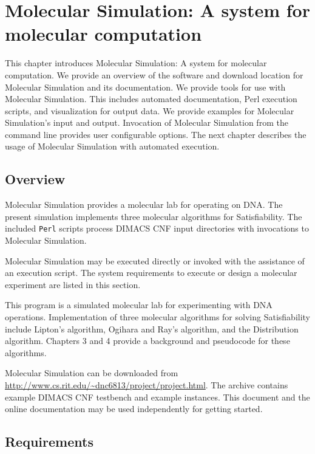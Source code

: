 \chapter{Molecular Simulation: A system for molecular computation}


This chapter introduces Molecular Simulation: A system for molecular computation.  We provide an overview of the software and download location for Molecular Simulation and its documentation. We provide tools for use with Molecular Simulation.  This includes automated documentation, Perl execution scripts, and visualization for output data.  We provide examples for Molecular Simulation's input and output.  Invocation of Molecular Simulation from the command line provides user configurable options.  The next chapter describes the usage of Molecular Simulation with automated execution.
	
	\section{Overview}
	

Molecular Simulation provides a molecular lab for operating on DNA.  The present simulation implements three molecular algorithms for {\sc Satisfiability}.  The included \texttt{Perl} scripts process DIMACS CNF input directories with invocations to Molecular Simulation.

Molecular Simulation may be executed directly or invoked with the assistance of an execution script.  The system requirements to execute or design a molecular experiment are listed in this section.  
		
This program is a simulated molecular lab for experimenting with DNA operations. Implementation of three molecular algorithms for solving {\sc Satisfiability} include Lipton's algorithm, Ogihara and Ray's algorithm, and the Distribution algorithm.  Chapters 3 and 4 provide a background and pseudocode for these algorithms.		

Molecular Simulation can be downloaded from \url{http://www.cs.rit.edu/~dnc6813/project/project.html}.  The archive contains example DIMACS CNF testbench and example instances.  This document and the online documentation may be used independently for getting started.

 	\section{Requirements}
 	
